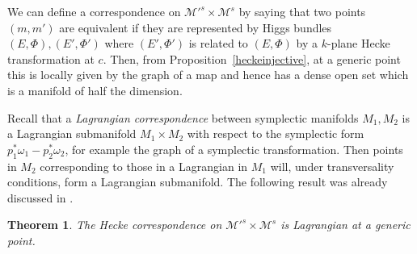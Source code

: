 \documentclass[12pt]{article}
\numberwithin{equation}{section}
\newtheorem{theorem}{Theorem}
\theoremstyle{remark}
\theoremstyle{definition}
\numberwithin{theorem}{section}
\renewcommand{\1}{\mathbbm{1}}
\begin{document}
We can define a correspondence on ${\mathcal M}'^s\times {\mathcal M}^s$ by saying that two points $(m,m')$ are equivalent if they are represented by Higgs bundles $(E,\Phi), (E',\Phi')$ where $(E',\Phi')$ is related to $(E,\Phi)$ by a $k$-plane Hecke transformation at $c$. Then, from Proposition~\ref{heckeinjective},  
at a generic point this is locally given by the graph of a map and hence has a dense open set which is a manifold of half the dimension. 





Recall that a {\em Lagrangian correspondence} between symplectic manifolds $M_1,M_2$ is a Lagrangian submanifold  $ M_1\times M_2$ with respect to the symplectic form $p_1^*\omega_1-p_2^*\omega_2$, for example the graph of a symplectic transformation. Then points in $M_2$ corresponding to those in a Lagrangian in $M_1$ will, under transversality conditions, form a Lagrangian submanifold. The following result was already discussed in \cite[pp.185-186]{kapustin-witten}. 

\begin{theorem} The Hecke correspondence on ${\mathcal M}'^s\times {\mathcal M}^s$ is Lagrangian at a generic point.
\end{theorem}
\end{document}
